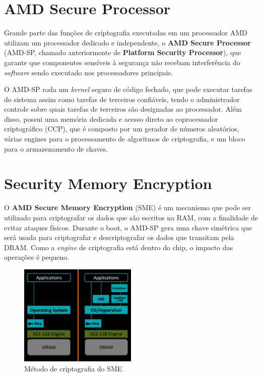 \documentclass{report}
\begin{document}
\section{AMD Secure Processor}

Grande parte das funções de criptografia executadas em um processador AMD
utilizam um processador dedicado e independente, o \textbf{AMD Secure
Processor} (AMD-SP, chamado anteriormente de \textbf{Platform Security
Processor}), que garante que componentes sensíveis à segurança não recebam
interferência do \textit{software} sendo executado nos processadores
principais.

O AMD-SP roda um \textit{kernel} seguro de código fechado, que pode executar
tarefas do sistema assim como tarefas de terceiros confiáveis, tendo o
administrador controle sobre quais tarefas de terceiros são designadas ao
processador. Além disso, possui uma memória dedicada e acesso direto ao
coprocessador criptográfico (CCP), que é composto por um gerador de números
aleatórios, várias engines para o processamento de algoritmos de criptografia,
e um bloco para o armazenamento de chaves.

\section{Security Memory Encryption}
O \textbf{AMD Secure Memory Encryption} (SME) é um mecanismo que pode ser
utilizado para criptografar os dados que são escritos na RAM, com a finalidade
de evitar ataques físicos. Durante o boot, o AMD-SP gera uma chave simétrica
que será usada para criptografar e descriptografar os dados que transitam pela
DRAM. Como a \textit{engine} de criptografia está dentro do chip, o impacto das
operações é pequeno.

\begin{figure}[h]
    \centering
    \includegraphics[width=0.5\textwidth]{img/sme}
    \caption{Método de criptografia do SME}\label{sme-1}
\end{figure}
\end{document}

